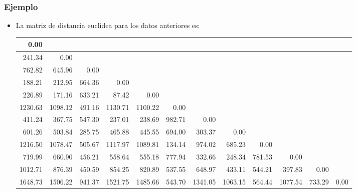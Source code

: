 \begin{frame}
\frametitle{Ejemplo}
\begin{itemize}
\item<2->{La matriz de distancia euclidea para los datos anteriores es:
\begin{center}
{\tiny
\begin{tabular}{|@{}r@{}|@{}r@{}|@{}r@{}|@{}r@{}|@{}r@{}|@{}r@{}|@{}r@{}|@{}r@{}|@{}r@{}|@{}r@{}|@{}r@{}|@{}r@{}|}\hline
0.00 &&&&&&&&&&&\\\hline                                                                                                                         
241.34&    0.00&&&&&&&&&&\\        \hline                                                                                                        
762.82&  645.96 &    0.00&&&&&&&&&\\\hline                                                                                                     
188.21 &  212.95 &  664.36 &    0.00&&&&&&&&\\        \hline                                                                                  
226.89& 171.16&  633.21&   87.42&    0.00&&&&&&&\\         \hline                                                                      
1230.63&1098.12&  491.16& 1130.71& 1100.22 &    0.00&&&&&&\\         \hline                                                           
411.24&  367.75&  547.30&  237.01&  238.69&  982.71 &   0.00&&&&&\\              \hline                                           
601.26 &  503.84& 285.75&  465.88&  445.55&  694.00&  303.37&    0.00&&&&\\     \hline                                         
1216.50&1078.47&  505.67& 1117.97& 1089.81&  134.14&  974.02&  685.23&    0.00&&&\\      \hline                             
719.99&  660.90&  456.21&  558.64&  555.18&  777.94&  332.66&  248.34&  781.53&    0.00&&\\      \hline                  
1012.71&  876.39&  450.59&  854.25&  820.89&  537.55&  648.97&  433.11&  544.21&  397.83&    0.00&\\    \hline         
1648.73& 1506.22&  941.37& 1521.75& 1485.66&  543.70& 1341.05& 1063.15&  564.44& 1077.54&  733.29&    0.00 \\\hline  
\end{tabular}}
\end{center}}
\end{itemize}
\end{frame}
